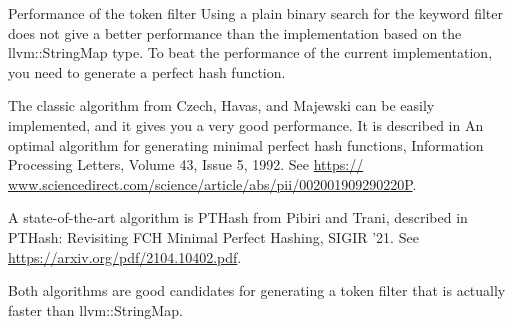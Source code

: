 \begin{myTip}{Performance of the token filter}
Using a plain binary search for the keyword filter does not give a better performance than the implementation based on the llvm::StringMap type. To beat the performance of the current implementation, you need to generate a perfect hash function.

The classic algorithm from Czech, Havas, and Majewski can be easily implemented, and it gives you a very good performance. It is described in An optimal algorithm for generating minimal perfect hash functions, Information Processing Letters, Volume 43, Issue 5, 1992. See \url{https:// www.sciencedirect.com/science/article/abs/pii/002001909290220P}.

A state-of-the-art algorithm is PTHash from Pibiri and Trani, described in PTHash: Revisiting FCH Minimal Perfect Hashing, SIGIR ’21. See \url{https://arxiv.org/pdf/2104.10402.pdf}.

Both algorithms are good candidates for generating a token filter that is actually faster than llvm::StringMap.
\end{myTip}




















